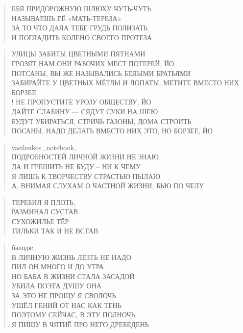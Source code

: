 \poemtitle{***}
\begin{verse}
ЕБЯ ПРИДОРОЖНУЮ ШЛЮХУ ЧУТЬ-ЧУТЬ\\
НАЗЫВАЕШЬ ЕЁ «МАТЬ-ТЕРЕЗА»\\
ЗА ТО ЧТО ДАЛА ТЕБЕ ГРУДЬ ПОЛИЗАТЬ\\
И ПОГЛАДИТЬ КОЛЕНО СВОЕГО ПРОТЕЗА
\end{verse}

\poemtitle{***}
\begin{verse}
УЛИЦЫ ЗАБИТЫ ЦВЕТНЫМИ ПЯТНАМИ\\
ГРОЗЯТ НАМ ОНИ РАБОЧИХ МЕСТ ПОТЕРЕЙ, ЙО\\
ПОТСАНЫ, ВЫ ЖЕ НАЗЫВАЛИСЬ БЕЛЫМИ БРАТЬЯМИ\\
ЗАБИРАЙТЕ У ЦВЕТНЫХ МЁТЛЫ И ЛОПАТЫ, МЕТИТЕ ВМЕСТО НИХ БОРЗЕЕ\\!
НЕ ПРОПУСТИТЕ УРОЗУ ОБЩЕСТВУ, ЙО\\
ДАЙТЕ СЛАБИНУ — СЯДУТ СУКИ НА ШЕЮ\\
БУДУТ УБИРАТЬСЯ, СТРИЧЬ ГАЗОНЫ, ДОМА СТРОИТЬ\\
ПОСАНЫ, НАДО ДЕЛАТЬ ВМЕСТО НИХ ЭТО, НО БОРЗЕЕ, ЙО
\end{verse}

\poemtitle{***}
\begin{verse}
vasilenkos\_notebook,\\
ПОДРОБНОСТЕЙ ЛИЧНОЙ ЖИЗНИ НЕ ЗНАЮ\\
ДА И ГРЕШИТЬ НЕ БУДУ -- НИ К ЧЕМУ\\
Я ЛИШЬ К ТВОРЧЕСТВУ СТРАСТЬЮ ПЫЛАЮ\\
А, ВНИМАЯ СЛУХАМ О ЧАСТНОЙ ЖИЗНИ, БЬЮ ПО ЧЕЛУ
\end{verse}

\poemtitle{***}
\begin{verse}
ТЕРЕБИЛ Я ПЛОТЬ, \\
РАЗМИНАЛ СУСТАВ\\
СУХОЖИЛЬЕ ТЁР\\
ТИЛЬКИ ТАК И НЕ ВСТАВ
\end{verse}

\poemtitle{***}
\begin{verse}
балодя: \\
В ЛИЧНУЮ ЖИЗНЬ ЛЕЗТЬ НЕ НАДО\\
ПИЛ ОН МНОГО И ДО УТРА\\
НО БАБА В ЖИЗНИ СТАЛА ЗАСАДОЙ\\
УБИЛА ПОЭТА ДУШУ ОНА\\
ЗА ЭТО НЕ ПРОЩУ Я СВОЛОЧЬ\\
УШЁЛ ГЕНИЙ ОТ НАС КАК ТЕНЬ\\
ПОЭТОМУ СЕЙЧАС, В ЭТУ ПОЛНОЧЬ\\
Я ПИШУ В ЧЯТИЁ ПРО НЕГО ДРЕБЕДЕНЬ
\end{verse}

